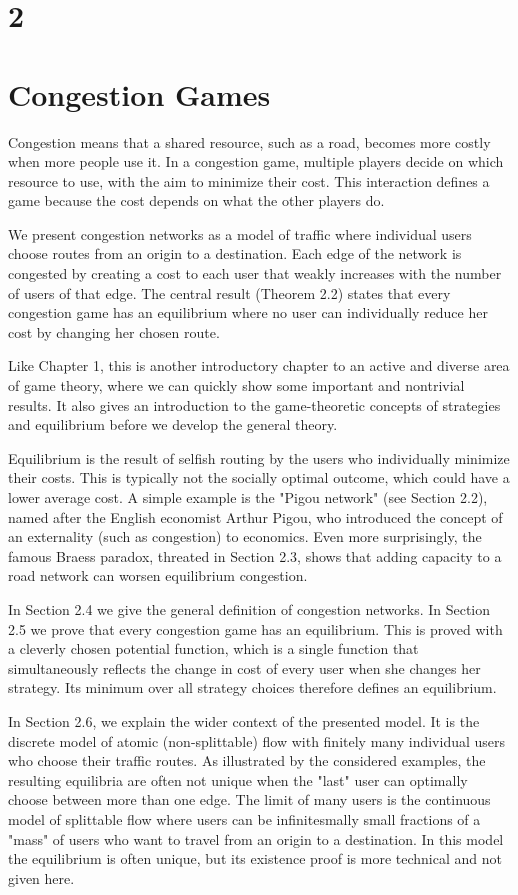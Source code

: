 \documentclass[12pt]{article}
\begin{document}
\section*{2}
\section*{Congestion Games}
Congestion means that a shared resource, such as a road, becomes more costly when more people use it. In a congestion game, multiple players decide on which resource to use, with the aim to minimize their cost. This interaction defines a game because the cost depends on what the other players do.

We present congestion networks as a model of traffic where individual users choose routes from an origin to a destination. Each edge of the network is congested by creating a cost to each user that weakly increases with the number of users of that edge. The central result (Theorem 2.2) states that every congestion game has an equilibrium where no user can individually reduce her cost by changing her chosen route.

Like Chapter 1, this is another introductory chapter to an active and diverse area of game theory, where we can quickly show some important and nontrivial results. It also gives an introduction to the game-theoretic concepts of strategies and equilibrium before we develop the general theory.

Equilibrium is the result of selfish routing by the users who individually minimize their costs. This is typically not the socially optimal outcome, which could have a lower average cost. A simple example is the "Pigou network" (see Section 2.2), named after the English economist Arthur Pigou, who introduced the concept of an externality (such as congestion) to economics. Even more surprisingly, the famous Braess paradox, threated in Section 2.3, shows that adding capacity to a road network can worsen equilibrium congestion.

In Section 2.4 we give the general definition of congestion networks. In Section 2.5 we prove that every congestion game has an equilibrium. This is proved with a cleverly chosen potential function, which is a single function that simultaneously reflects the change in cost of every user when she changes her strategy. Its minimum over all strategy choices therefore defines an equilibrium.

In Section 2.6, we explain the wider context of the presented model. It is the discrete model of atomic (non-splittable) flow with finitely many individual users who choose their traffic routes. As illustrated by the considered examples, the\\
resulting equilibria are often not unique when the "last" user can optimally choose between more than one edge. The limit of many users is the continuous model of splittable flow where users can be infinitesmally small fractions of a "mass" of users who want to travel from an origin to a destination. In this model the equilibrium is often unique, but its existence proof is more technical and not given here.
\end{document}
